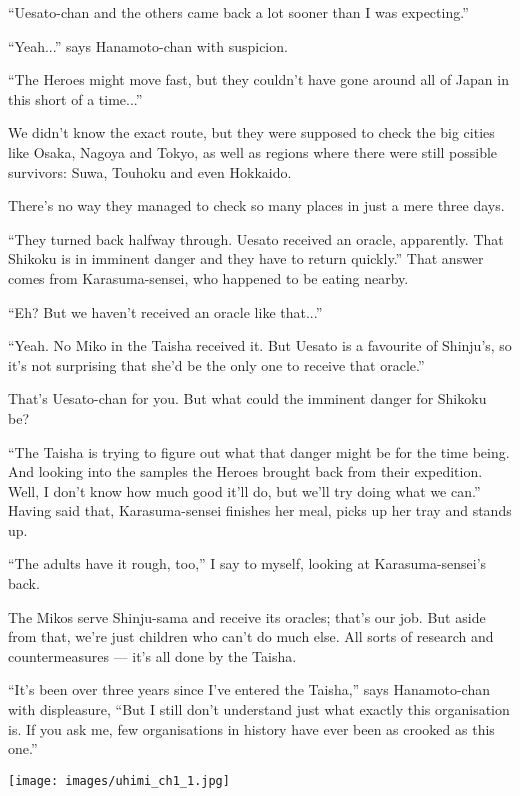 ``Uesato-chan and the others came back a lot sooner than I was expecting.''

``Yeah...'' says Hanamoto-chan with suspicion.

``The Heroes might move fast, but they couldn't have gone around all of Japan in this short of a time...''

We didn't know the exact route, but they were supposed to check the big cities like Osaka, Nagoya and Tokyo, as well as regions where there were still possible survivors: Suwa, Touhoku and even Hokkaido.

There's no way they managed to check so many places in just a mere three days.

``They turned back halfway through. Uesato received an oracle, apparently. That Shikoku is in imminent danger and they have to return quickly.''  That answer comes from Karasuma-sensei, who happened to be eating nearby.

``Eh? But we haven't received an oracle like that...''

``Yeah. No Miko in the Taisha received it. But Uesato is a favourite of Shinju's, so it's not surprising that she'd be the only one to receive that oracle.''

That's Uesato-chan for you. But what could the imminent danger for Shikoku be?

``The Taisha is trying to figure out what that danger might be for the time being. And looking into the samples the Heroes brought back from their expedition. Well, I don't know how much good it'll do, but we'll try doing what we can.''  Having said that, Karasuma-sensei finishes her meal, picks up her tray and stands up.

``The adults have it rough, too,'' I say to myself, looking at Karasuma-sensei's back.

The Mikos serve Shinju-sama and receive its oracles; that's our job. But aside from that, we're just children who can't do much else. All sorts of research and countermeasures --- it's all done by the Taisha.

``It's been over three years since I've entered the Taisha,'' says Hanamoto-chan with displeasure, ``But I still don't understand just what exactly this organisation is. If you ask me, few organisations in history have ever been as crooked as this one.''

\newpage
\thispagestyle{empty}
\texttt{[image: images/uhimi\_ch1\_1.jpg]}

